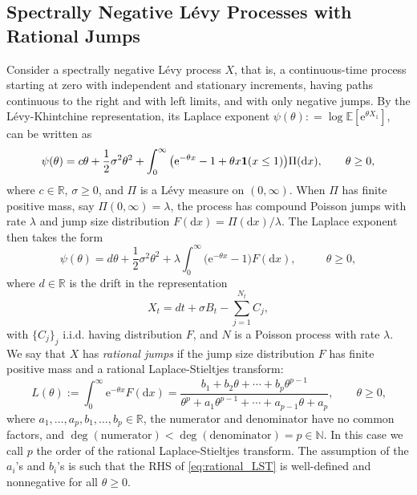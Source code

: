 \documentclass[a4paper,11pt]{article}
\numberwithin{equation}{section}
\theoremstyle{plain}
\theoremstyle{definition}
\newcommand{\1}{\mathbf{1}}
\newcommand{\e}{\mathrm{e}}
\newcommand{\dd}{\mathrm{d}}
\newcommand{\EE}{\mathbb{E}}
\begin{document}
\subsection{Spectrally Negative Lévy Processes with Rational Jumps}
Consider a spectrally negative Lévy process $X$, that is, a continuous-time process starting at zero with independent and stationary increments, having paths continuous to the right and with left limits, and with only negative jumps. By the Lévy-Khintchine representation, its Laplace exponent $\psi(\theta): = \log \EE[\e^{\theta X_1}]$, can be written as
\begin{equation}\label{eq:levy_khintchine}
\psi(\theta) = c\theta + \frac{1}{2}\sigma^2\theta^2 + \int_{0}^\infty\big(\e^{-\theta x} - 1+\theta x{\bf 1}(x\leq 1)\big)\Pi(\dd x),\qquad \mbox{$\theta\geq 0$,}
\end{equation}
where $c \in \mathbb{R}$, $\sigma \ge 0$, and $\Pi$ is a Lévy measure on $(0,\infty)$. When $\Pi$ has finite positive mass, say $\Pi(0,\infty) = \lambda$, the process has compound Poisson jumps with rate $\lambda$  and jump size distribution $F(\dd x) = \Pi(\dd x)/\lambda$. The Laplace exponent then takes the form
\begin{equation}\label{eq:psi_compound_poisson}
\psi(\theta) = d\theta + \frac{1}{2}\sigma^2\theta^2 + \lambda\int_{0}^\infty\big(\e^{-\theta x}-1\big) F(\dd x),\qquad \mbox{ $\theta\geq 0$},
\end{equation}where $d\in \mathbb{R}$ is the drift in the representation
\begin{equation}\label{eqnXTrajectories}
X_t=dt+\sigma B_t-\sum_{j=1}^{N_t}C_j,
\end{equation}with $\{C_j\}_j$  i.i.d. having distribution $F$, and $N$ is a Poisson process with rate $\lambda$.
We say that $X$ has \emph{rational jumps}  if the jump size distribution $F$ has finite positive mass and a rational Laplace-Stieltjes transform:
\begin{equation}\label{eq:rational_LST}
L(\theta) := \int_0^\infty \e^{-\theta x} F(\dd x) = \frac{b_1 + b_2\theta + \cdots + b_p\theta^{p-1}}{\theta^p + a_1\theta^{p-1} + \cdots + a_{p-1}\theta + a_p},\qquad \mbox{$\theta\geq 0$,}
\end{equation}
where $a_1, \ldots, a_p, b_1, \ldots, b_p \in \mathbb{R}$, the numerator and denominator have no common factors, and $\deg(\text{numerator}) < \deg(\text{denominator}) = p\in \mathbb{N}$. 
In this case we call $p$ the order of the rational Laplace-Stieltjes transform.
The assumption of the $a_i$'s and $b_i$'s is such that the RHS of \eqref{eq:rational_LST} is well-defined and nonnegative for all $\theta\geq 0$. 
\end{document}
